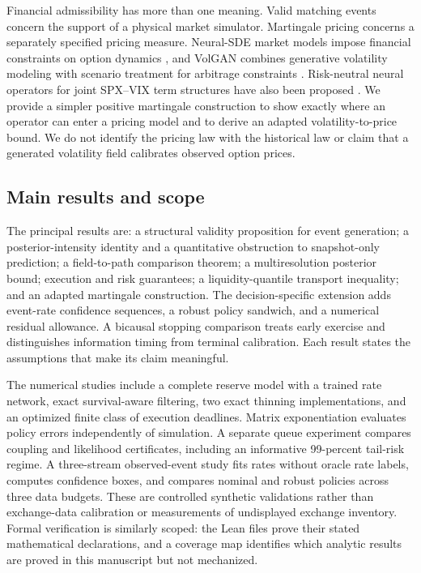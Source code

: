 Financial admissibility has more than one meaning. Valid matching events concern the support of a physical market simulator. Martingale pricing concerns a separately specified pricing measure. Neural-SDE market models impose financial constraints on option dynamics \citep{cohen2021}, and VolGAN combines generative volatility modeling with scenario treatment for arbitrage constraints \citep{vuletic2024}. Risk-neutral neural operators for joint SPX--VIX term structures have also been proposed \citep{zhang2025}. We provide a simpler positive martingale construction to show exactly where an operator can enter a pricing model and to derive an adapted volatility-to-price bound. We do not identify the pricing law with the historical law or claim that a generated volatility field calibrates observed option prices.

\subsection{Main results and scope}
The principal results are: a structural validity proposition for event generation; a posterior-intensity identity and a quantitative obstruction to snapshot-only prediction; a field-to-path comparison theorem; a multiresolution posterior bound; execution and risk guarantees; a liquidity-quantile transport inequality; and an adapted martingale construction. The decision-specific extension adds event-rate confidence sequences, a robust policy sandwich, and a numerical residual allowance. A bicausal stopping comparison treats early exercise and distinguishes information timing from terminal calibration. Each result states the assumptions that make its claim meaningful.

The numerical studies include a complete reserve model with a trained rate network, exact survival-aware filtering, two exact thinning implementations, and an optimized finite class of execution deadlines. Matrix exponentiation evaluates policy errors independently of simulation. A separate queue experiment compares coupling and likelihood certificates, including an informative 99-percent tail-risk regime. A three-stream observed-event study fits rates without oracle rate labels, computes confidence boxes, and compares nominal and robust policies across three data budgets. These are controlled synthetic validations rather than exchange-data calibration or measurements of undisplayed exchange inventory. Formal verification is similarly scoped: the Lean files prove their stated mathematical declarations, and a coverage map identifies which analytic results are proved in this manuscript but not mechanized.
